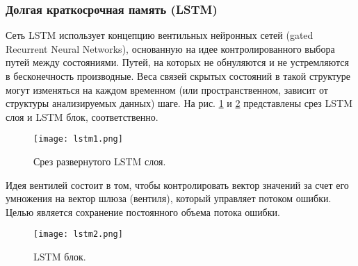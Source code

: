\subsubsection{Долгая краткосрочная память (LSTM)}
Сеть LSTM \cite{Schmidhuber:1996} использует концепцию вентильных нейронных сетей (gated Recurrent Neural Networks), основанную на идее контролированного выбора путей между состояниями. Путей, на которых не обнуляются и не устремляются в бесконечность производные. Веса связей скрытых состояний в такой структуре могут изменяться на каждом временном (или пространственном, зависит от структуры анализируемых данных) шаге. На рис. \ref{fig:lstm1} и \ref{fig:lstm2} представлены срез LSTM слоя и LSTM блок, соответственно.
\begin{figure}[H]
    \centering
    \texttt{[image: lstm1.png]}
    \caption{Срез развернутого LSTM слоя.}
    \label{fig:lstm1}
\end{figure}
Идея вентилей состоит в том, чтобы контролировать вектор значений за счет его умножения на вектор шлюза (вентиля), который управляет потоком ошибки. Целью является сохранение постоянного объема потока ошибки.\\
\begin{figure}[ht]
    \centering
    \texttt{[image: lstm2.png]}
    \caption{LSTM блок.}
    \label{fig:lstm2}
\end{figure}

